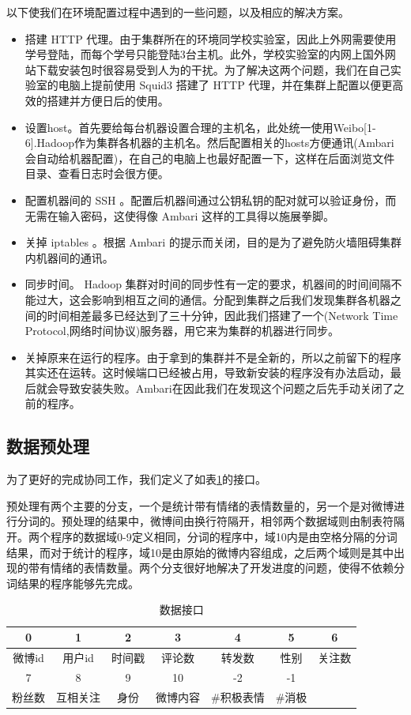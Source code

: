 \documentclass[12pt, oneside]{article}
\begin{document}
\begin{spacing}{1.5}
\begin{CJK}{UTF8}{gbsn}
以下使我们在环境配置过程中遇到的一些问题，以及相应的解决方案。

\begin{itemize}
	\item 搭建 HTTP 代理。由于集群所在的环境同学校实验室，因此上外网需要使用学号登陆，而每个学号只能登陆3台主机。此外，学校实验室的内网上国外网站下载安装包时很容易受到人为的干扰。为了解决这两个问题，我们在自己实验室的电脑上提前使用 Squid3 搭建了 HTTP 代理，并在集群上配置以便更高效的搭建并方便日后的使用。
	\item 设置host。首先要给每台机器设置合理的主机名，此处统一使用Weibo[1-6].Hadoop作为集群各机器的主机名。然后配置相关的hosts方便通讯(Ambari会自动给机器配置)，在自己的电脑上也最好配置一下，这样在后面浏览文件目录、查看日志时会很方便。
	\item 配置机器间的 SSH 。配置后机器间通过公钥私钥的配对就可以验证身份，而无需在输入密码，这使得像 Ambari 这样的工具得以施展拳脚。
	\item 关掉 iptables 。根据 Ambari 的提示而关闭，目的是为了避免防火墙阻碍集群内机器间的通讯。
	\item 同步时间。 Hadoop 集群对时间的同步性有一定的要求，机器间的时间间隔不能过大，这会影响到相互之间的通信。分配到集群之后我们发现集群各机器之间的时间相差最多已经达到了三十分钟，因此我们搭建了一个(Network Time Protocol,网络时间协议)服务器，用它来为集群的机器进行同步。
	\item 关掉原来在运行的程序。由于拿到的集群并不是全新的，所以之前留下的程序其实还在运转。这时候端口已经被占用，导致新安装的程序没有办法启动，最后就会导致安装失败。Ambari在因此我们在发现这个问题之后先手动关闭了之前的程序。
\end{itemize}

\subsection{数据预处理}
为了更好的完成协同工作，我们定义了如表\ref{tbl:interface}的接口。

预处理有两个主要的分支，一个是统计带有情绪的表情数量的，另一个是对微博进行分词的。预处理的结果中，微博间由换行符隔开，相邻两个数据域则由制表符隔开。两个程序的数据域0-9定义相同，分词的程序中，域10内是由空格分隔的分词结果，而对于统计的程序，域10是由原始的微博内容组成，之后两个域则是其中出现的带有情绪的表情数量。两个分支很好地解决了开发进度的问题，使得不依赖分词结果的程序能够先完成。


\begin{table}[]
\centering
\begin{tabular}{|c|c|c|c|c|c|c|}
\hline
0    & 1    & 2   & 3    & 4      & 5    & 6   \\ \hline
微博id & 用户id & 时间戳 & 评论数  & 转发数    & 性别   & 关注数 \\ \hline
7    & 8    & 9   & 10   & -2     & -1   &     \\ \hline
粉丝数  & 互相关注 & 身份  & 微博内容 & \#积极表情 & \#消极 &     \\ \hline
\end{tabular}
\caption{数据接口}
\label{tbl:interface}
\end{table}


\end{CJK}
\end{spacing}
\end{document}
